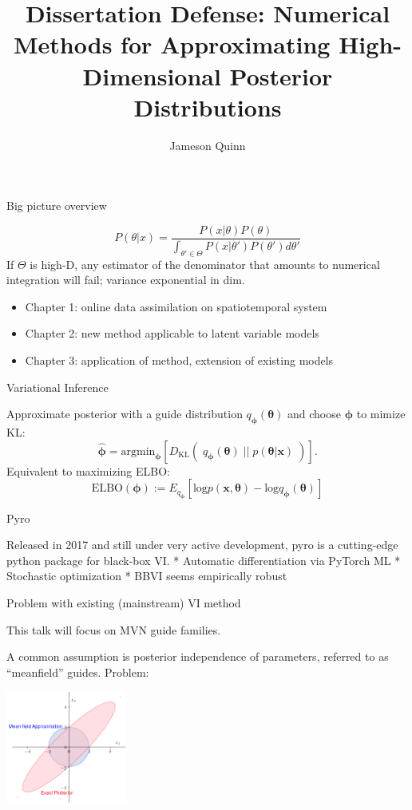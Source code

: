 \documentclass[ignorenonframetext,]{beamer}
\title{Dissertation Defense: Numerical Methods for Approximating
High-Dimensional Posterior Distributions}
\author{Jameson Quinn}
\date{}
\providecommand{\tightlist}{%
\setlength{\itemsep}{0pt}\setlength{\parskip}{0pt}}
\begin{document}
\frame{\titlepage}

\begin{frame}{Big picture overview}

\[P(\theta|x)=\frac{P(x|\theta)P(\theta)}{\int_{\theta'\in\Theta} P(x|\theta')P(\theta')d\theta'}\]
If \(\Theta\) is high-D, any estimator of the denominator that amounts
to numerical integration will fail; variance exponential in dim.

\begin{itemize}
\tightlist
\item
  Chapter 1: online data assimilation on spatiotemporal system
\item
  Chapter 2: new method applicable to latent variable models
\item
  Chapter 3: application of method, extension of existing models
\end{itemize}

\end{frame}

\begin{frame}{Variational Inference}

Approximate posterior with a guide distribution
\(q_{\bm{\phi}}(\bm{\theta})\) and choose \(\bm{\phi}\) to mimize KL:
\[\hat{{\bm{\phi}}}=\mathrm{argmin}_{\bm{\phi}}\left[D_{\mathrm{KL}} \left(\;q_{\bm{\phi}}(\bm{\theta})\;\big|\big|\; p(\bm{\theta}|\bm{x})\;\right)\right].\]
Equivalent to maximizing ELBO:
\[\mathrm{ELBO}({\bm{\phi}}):=E_{q_{\bm{\phi}}}
\left[\mathrm{log} p(\bm{x},\bm{\theta})-\mathrm{log} q_{\bm{\phi}}(\bm{\theta})\right]\]

\end{frame}

\begin{frame}{Pyro}

Released in 2017 and still under very active development, pyro is a
cutting-edge python package for black-box VI. * Automatic
differentiation via PyTorch ML * Stochastic optimization * BBVI seems
empirically robust

\end{frame}

\begin{frame}{Problem with existing (mainstream) VI method}

This talk will focus on MVN guide families.

A common assumption is posterior independence of parameters, referred to
as ``meanfield'' guides. Problem:

\begin{center}\includegraphics[width=150px]{meanfield_covar_figure} \end{center}

\end{frame}
\end{document}
